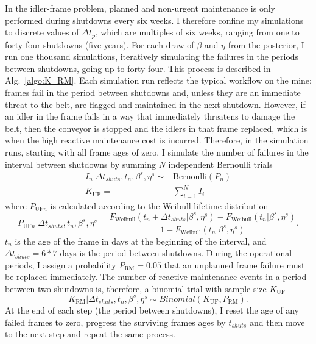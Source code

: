 In the idler-frame problem, planned and non-urgent maintenance is only performed during shutdowns every six weeks. I therefore confine my simulations to discrete values of $\Delta t_p$, which are multiples of six weeks, ranging from one to forty-four shutdowns (five years). For each draw of $\beta$ and $\eta$ from the posterior, I run one thousand simulations, iteratively simulating the failures in the periods between shutdowns, going up to forty-four. This process is described in Alg.~\ref{algo:K_RM}. Each simulation run reflects the typical workflow on the mine; frames fail in the period between shutdowns and, unless they are an immediate threat to the belt, are flagged and maintained in the next shutdown. However, if an idler in the frame fails in a way that immediately threatens to damage the belt, then the conveyor is stopped and the idlers in that frame replaced, which is when the high reactive maintenance cost is incurred. Therefore, in the simulation runs, starting with all frame ages of zero, I simulate the number of failures in the interval between shutdowns by summing $N$ independent Bernoulli trials
\begin{align*}
 I_n|\Delta t_{shuts}, t_n, \beta^s, \eta^s \sim & \mbox{Bernoulli}(P_{n}) \\
 K_{\text{UF}} = & \sum^N_{i = 1} I_i
\end{align*}
where $P_{\text{UF} n}$ is calculated according to the Weibull lifetime distribution
\begin{equation*}
 P_{\text{UF} n}|\Delta t_{shuts}, t_n, \beta^s, \eta^s = \frac{F_{\text{Weibull}}(t_n + \Delta t_{shuts}|\beta^s, \eta^s) - F_{\text{Weibull}}(t_n|\beta^s, \eta^s)}{1 - F_{\text{Weibull}}(t_n|\beta^s, \eta^s)}.
\end{equation*}
$t_n$ is the age of the frame in days at the beginning of the interval, and $\Delta t_{shuts} = 6 * 7$ days is the period between shutdowns. During the operational periods, I assign a probability $P_{\text{RM}} = 0.05$ that an unplanned frame failure must be replaced immediately. The number of reactive maintenance events in a period between two shutdowns is, therefore, a binomial trial with sample size $K_{\text{UF}}$
\begin{equation*}
 K_{\text{RM}}|\Delta t_{shuts}, t_n, \beta^s, \eta^s \sim Binomial(K_{\text{UF}}, P_{\text{RM}}).
\end{equation*}
At the end of each step (the period between shutdowns), I reset the age of any failed frames to zero, progress the surviving frames ages by $t_{shuts}$ and then move to the next step and repeat the same process.

